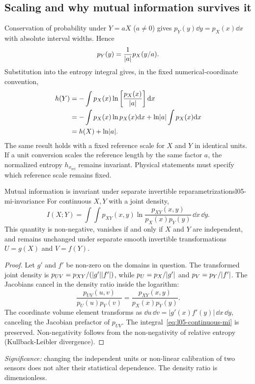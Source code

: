 \subsection{Scaling and why mutual information survives it}
\label{subsec:l05-mi-invariance}
Conservation of probability under $Y=aX$ ($a\neq0$) gives $p_Y(y)\dd y=p_X(x)\dd x$ with absolute interval widths. Hence
\begin{equation}
p_Y(y)=\frac1{\lvert a\rvert}p_X(y/a).
\label{eq:l05-scale-pdf}
\end{equation}
Substitution into the entropy integral gives, in the fixed numerical-coordinate convention,
\begin{align}
h(Y)&=-\int p_X(x)\ln\left[\frac{p_X(x)}{\lvert a\rvert}\right]\mathrm{d} x \notag\\
&=-\int p_X(x)\ln p_X(x)\mathrm{d} x
 +\ln\lvert a\rvert\int p_X(x)\mathrm{d} x \notag\\
&=h(X)+\ln\lvert a\rvert.
\label{eq:l05-scale-entropy}
\end{align}
The same result holds with a fixed reference scale for $X$ and $Y$ in identical units. If a unit conversion scales the reference length by the same factor $a$, the normalized entropy $h_{x_{\mathrm{ref}}}$ remains invariant. Physical statements must specify which reference scale remains fixed.

\begin{proposition}{Mutual information is invariant under separate invertible reparametrizations}{l05-mi-invariance}
For continuous $X,Y$ with a joint density,
\begin{equation}
I(X;Y)=\int\!\int p_{XY}(x,y)
\ln\frac{p_{XY}(x,y)}{p_X(x)p_Y(y)}\,\dd x\,\dd y.
\label{eq:l05-continuous-mi}
\end{equation}
This quantity is non-negative, vanishes if and only if $X$ and $Y$ are independent, and remains unchanged under separate smooth invertible transformations $U=g(X)$ and $V=f(Y)$.
\end{proposition}
\begin{proof}
Let $g'$ and $f'$ be non-zero on the domains in question. The transformed joint density is $p_{UV}=p_{XY}/(\lvert g'\rvert\lvert f'\rvert)$, while $p_U=p_X/\lvert g'\rvert$ and $p_V=p_Y/\lvert f'\rvert$. The Jacobians cancel in the density ratio inside the logarithm:
\begin{equation}
\frac{p_{UV}(u,v)}{p_U(u)p_V(v)} = \frac{p_{XY}(x,y)}{p_X(x)p_Y(y)}.
\end{equation}
The coordinate volume element transforms as $\dd u\,\dd v = |g'(x)f'(y)|\,\dd x\,\dd y$, canceling the Jacobian prefactor of $p_{UV}$. The integral~\eqref{eq:l05-continuous-mi} is preserved. Non-negativity follows from the non-negativity of relative entropy (Kullback-Leibler divergence).
\end{proof}
\textit{Significance:} changing the independent units or non-linear calibration of two sensors does not alter their statistical dependence. The density ratio is dimensionless.

